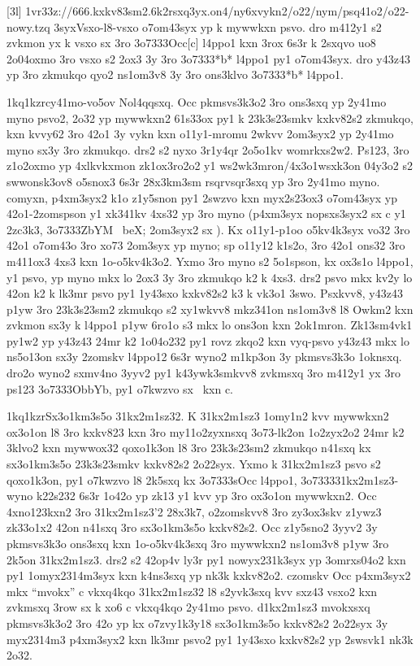 [3l]
\41v{r33z://666.kxkv83sm2.6k2rsxq3yx.on4/ny6xvykn2/o22/nym/psq41o2/o22-nowy.tzq}
  \mkz3syx{Vsxo-l8-vsxo o7om43syx yp k mywwkxn psvo. dro m412y1 s2
    zvkmon yx k vsxo sx 3ro \23o7333{Occ[c]} l4ppo1 kxn 3rox 6s3r k 2sxqvo
    uo8 2o04oxmo
    3ro vsxo s2 2ox3 3y 3ro \23o7333{*b*} l4ppo1 py1
    o7om43syx.  dro y43z43 yp 3ro zkmukqo qyo2 ns1om3v8 3y 3ro
    ons3klvo \23o7333{*b*} l4ppo1.}

\zk1kq1kzr{cy41mo-vo5ov Nol4qqsxq.}
Occ pkmsvs3k3o2 3ro ons3sxq yp 2y41mo myno psvo2, 2o32 yp mywwkxn2
61s33ox py1 k 23k3s23smkv kxkv82s2 zkmukqo, kxn kvvy62 3ro 42o1 3y
vykn kxn o11y1-mromu 2wkvv 2om3syx2 yp 2y41mo myno sx3y 3ro zkmukqo.
drs2 s2 nyxo 3r1y4qr 2o5o1kv womrkxs2w2.  Ps123, 3ro z1o2oxmo yp
4xlkvkxmon zk1ox3ro2o2 y1 ws2wk3mron/4x3o1wsxk3on 04y3o2 s2
swwonsk3ov8 o5snox3 6s3r 28x3km3sm rsqrvsqr3sxq yp 3ro 2y41mo myno.
comyxn, p4xm3syx2 k1o z1y5snon py1 2swzvo kxn myx2s23ox3 o7om43syx yp
42o1-2zomspson y1 xk341kv 4xs32 yp 3ro myno (p4xm3syx nopsxs3syx2 sx c
y1 \hVs2zc3k3, \23o7333{ZbYM \ beX;} 2om3syx2 sx \cKc).  Kx
o11y1-p1oo o5kv4k3syx vo32 3ro 42o1 o7om43o 3ro xo73 2om3syx yp myno;
sp o11y12 k1s2o, 3ro 42o1 ons32 3ro m411ox3 4xs3 kxn 1o-o5kv4k3o2.
Yxmo 3ro myno s2 5o1spson, kx ox3s1o l4ppo1, y1 psvo, yp myno mkx lo
2ox3 3y 3ro zkmukqo k2 k 4xs3.  drs2 psvo mkx kv2y lo 42on k2 k lk3mr
psvo py1 1y43sxo kxkv82s2 k3 k vk3o1 3swo.  Psxkvv8, y43z43 p1yw 3ro
23k3s23sm2 zkmukqo s2 xy1wkvv8 mkz341on ns1om3v8 l8 Owkm2 kxn zvkmon
sx3y k l4ppo1 p1yw 6ro1o s3 mkx lo ons3on kxn 2ok1mron.  Zk13sm4vk1
py1w2 yp y43z43 24mr k2 1o04o232 py1 rovz zkqo2 kxn vyq-psvo y43z43
mkx lo ns5o13on sx3y 2zomskv l4ppo12 6s3r wyno2 m1kp3on 3y pkmsvs3k3o
1oknsxq.  dro2o wyno2 sxmv4no 3yyv2 py1 k43ywk3smkvv8 zvkmsxq 3ro
m412y1 yx 3ro ps123 \23o7333{ObbYb}, py1 o7kwzvo sx \cKc\ kxn c.

\zk1kq1kzr{Sx3o1km3s5o 31kx2m1sz32.}
K 31kx2m1sz3 1omy1n2 kvv mywwkxn2 ox3o1on l8 3ro kxkv823 kxn 3ro
my11o2zyxnsxq 3o73-lk2on 1o2zyx2o2 24mr k2 3klvo2 kxn mywwox32
qoxo1k3on l8 3ro 23k3s23sm2 zkmukqo n41sxq kx sx3o1km3s5o 23k3s23smkv
kxkv82s2 2o22syx.  Yxmo k 31kx2m1sz3 psvo s2 qoxo1k3on, py1 o7kwzvo l8
2k5sxq kx \23o7333{sOcc} l4ppo1, \23o7333{31kx2m1sz3-wyno} k22s232
6s3r 1o42o yp zk13 y1 kvv yp 3ro ox3o1on mywwkxn2.  Occ 4xno123kxn2
3ro 31kx2m1sz3'2 28x3k7, o2zomskvv8 3ro zy3ox3skv z1ywz3 zk33o1x2 42on
n41sxq 3ro sx3o1km3s5o kxkv82s2.  Occ z1y5sno2 3yyv2 3y pkmsvs3k3o
ons3sxq kxn 1o-o5kv4k3sxq 3ro mywwkxn2 ns1om3v8 p1yw 3ro 2k5on
31kx2m1sz3.  drs2 s2 42op4v ly3r py1 nowyx231k3syx yp 3omrxs04o2 kxn
py1 1omyx2314m3syx kxn k4ns3sxq yp nk3k kxkv82o2.  czomskv Occ
p4xm3syx2 mkx ``mvokx'' c vkxq4kqo 31kx2m1sz32 l8 s2yvk3sxq kvv sxz43
vsxo2 kxn zvkmsxq 3row sx k xo6 c vkxq4kqo 2y41mo psvo.  d1kx2m1sz3
mvokxsxq pkmsvs3k3o2 3ro 42o yp kx o7zvy1k3y18 sx3o1km3s5o kxkv82s2
2o22syx 3y myx2314m3 p4xm3syx2 kxn lk3mr psvo2 py1 1y43sxo kxkv82s2 yp
2swsvk1 nk3k 2o32.

